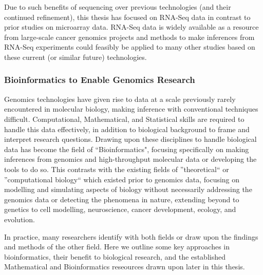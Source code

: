 Due to such benefits of sequencing over previous technologies (and their continued refinement), this thesis has focused on RNA-Seq data in contrast to prior studies on microarray data. RNA-Seq data is widely available as a resource from large-scale cancer genomics projects and methods to make inferences from RNA-Seq experiments could feasibly be applied to many other studies based on these current (or similar future) technologies.


\subsubsection{Bioinformatics to Enable Genomics Research}
Genomics technologies have given rise to data at a scale previously rarely encountered in molecular biology, making inference with conventional techniques difficult. Computational, Mathematical, and Statistical skills are required to handle this data effectively, in addition to biological background to frame and interpret research questions. Drawing upon these disciplines to handle biological data has become the field of ``Bioinformatics", focusing specifically on making inferences from genomics and high-throughput molecular data or developing the tools to do so. This contrasts with the existing fields of ''theoretical`` or ''computational biology`` which existed prior to genomics data, focusing on modelling and simulating aspects of biology without necessarily addressing the genomics data or detecting the phenomena in nature, extending beyond to genetics to cell modelling, neuroscience, cancer development, ecology, and evolution.

In practice, many researchers identify with both fields or draw upon the findings and methods of the other field. Here we outline some key approaches in bioinformatics, their benefit to biological research, and the established Mathematical and Bioinformatics reseources drawn upon later in this thesis.


